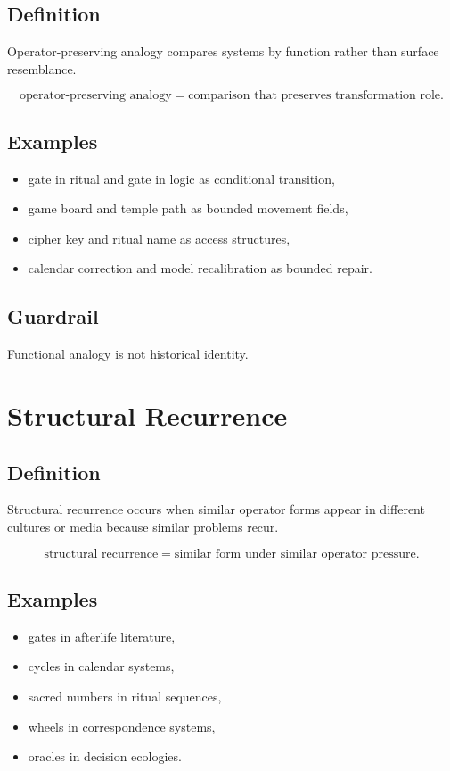 \documentclass[11pt]{book}
\begin{document}
\subsection*{Definition}

Operator-preserving analogy compares systems by function rather than surface resemblance.

\[
\text{operator-preserving analogy} =
\text{comparison that preserves transformation role}.
\]

\subsection*{Examples}

\begin{itemize}
    \item gate in ritual and gate in logic as conditional transition,
    \item game board and temple path as bounded movement fields,
    \item cipher key and ritual name as access structures,
    \item calendar correction and model recalibration as bounded repair.
\end{itemize}

\subsection*{Guardrail}

Functional analogy is not historical identity.

\section{Structural Recurrence}

\subsection*{Definition}

Structural recurrence occurs when similar operator forms appear in different cultures or media because similar problems recur.

\[
\text{structural recurrence} = \text{similar form under similar operator pressure}.
\]

\subsection*{Examples}

\begin{itemize}
    \item gates in afterlife literature,
    \item cycles in calendar systems,
    \item sacred numbers in ritual sequences,
    \item wheels in correspondence systems,
    \item oracles in decision ecologies.
\end{itemize}
\end{document}
